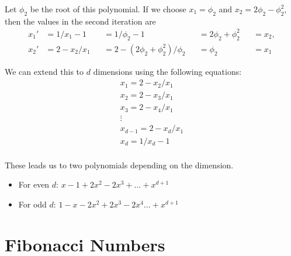 \documentclass[english,version-2020-11]{uzl-thesis}
\begin{document}
Let $\phi_2$ be the root of this polynomial.
If we choose $x_1 = \phi_2$ and $x_2 = 2\phi_2 - \phi_2^2$,
then the values in the second iteration are
\[\begin{aligned}
  x_1' & = 1 / x_1 - 1   &  & = 1 / \phi_2 - 1                    &  & = 2\phi_2 + \phi_2^2 &  & = x_2, \\
  x_2' & = 2 - x_2 / x_1 &  & = 2 - (2\phi_2 + \phi_2^2) / \phi_2 &  & = \phi_2             &  & = x_1
\end{aligned}\]

We can extend this to $d$ dimensions using the following equations:
\begin{align*}
  x_1 = 2 - x_2 / x_1 \\
  x_2 = 2 - x_3 / x_1 \\
  x_3 = 2 - x_4 / x_1 \\
  \vdots \\
  x_{d-1} = 2 - x_d / x_1 \\
  x_d = 1 / x_d - 1 \\
\end{align*}

These leads us to two polynomials depending on the dimension.
\begin{itemize}
  \item For even $d$: $x - 1 + 2 x^2 - 2 x^3 + \dots + x^{d+1}$
  \item For odd $d$: $1 - x - 2 x^2 + 2 x^3 - 2 x^4 \dots + x^{d+1}$
\end{itemize}


\section{Fibonacci Numbers}
\end{document}
